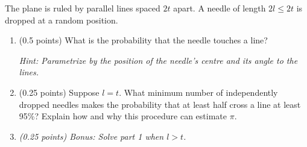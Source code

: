 \documentclass[a4paper]{report}
\begin{document}
\begin{problem}
The plane is ruled by parallel lines spaced $2t$ apart. A needle of length $2l\leq2t$ is dropped
at a random position.
\begin{enumerate}
    \item (0.5 points) What is the probability that the needle touches a line?

\textit{Hint: Parametrize by the position of the needle's centre and its angle to the lines.}

    \item (0.25 points) Suppose $l=t$.
    What minimum number of independently dropped needles makes the probability that at least half cross a line at least 95\%?
Explain how and why this procedure can estimate $\pi$.

\item \textit{(0.25 points) Bonus: Solve part 1 when $l>t$.}
\end{enumerate}
\end{problem}
\end{document}
